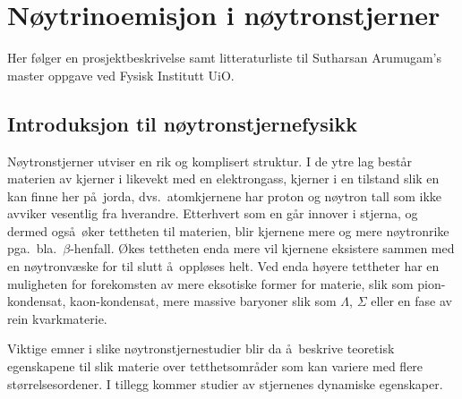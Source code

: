 


\pagestyle{plain}

\section*{N\o ytrinoemisjon i n\o ytronstjerner}

Her f\o lger en prosjektbeskrivelse samt litteraturliste til
Sutharsan  Arumugam's master oppgave ved Fysisk Institutt UiO.


\subsection*{Introduksjon til n\o ytronstjernefysikk}







N\o ytronstjerner utviser en rik og komplisert struktur.
I de ytre lag best\aa r materien 
av kjerner i likevekt med en elektrongass, 
kjerner i en tilstand slik en kan finne her p\aa\ jorda, 
dvs.\ atomkjernene har proton og n\o ytron tall som ikke
avviker vesentlig fra hverandre. 
Etterhvert som en g\aa r innover i stjerna, og dermed
ogs\aa\ \o ker tettheten til materien, blir kjernene mere
og mere n\o ytronrike pga.\ bla.\ $\beta$-henfall.
\O kes tettheten enda mere  
vil kjernene eksistere sammen med en n\o ytronv\ae ske for til
slutt \aa\ oppl\o ses helt. Ved enda h\o yere tettheter har
en muligheten for forekomsten av mere eksotiske former
for materie, slik som pion-kondensat, kaon-kondensat,
mere massive baryoner slik som $\Lambda$, $\Sigma$ eller
en fase av rein kvarkmaterie.

Viktige emner i slike n\o ytronstjernestudier blir da
\aa\ beskrive teoretisk egenskapene
til slik materie over tetthetsomr\aa der som kan variere
med flere st\o rrelsesordener. I tillegg kommer studier
av stjernenes dynamiske egenskaper.


